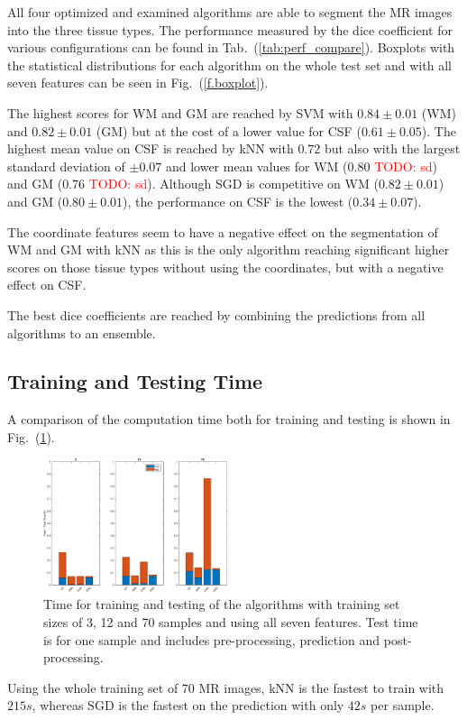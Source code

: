 \documentclass[journal]{IEEEtran}
\newcommand\TODO[1]{\textcolor{red}{TODO: #1}}
\begin{document}
All four optimized and examined algorithms are able to segment the MR images into the three tissue types. The performance measured by the dice coefficient for various configurations can be found in Tab.~(\ref{tab:perf_compare}). Boxplots with the statistical distributions for each algorithm on the whole test set and with all seven features can be seen in Fig.~(\ref{f.boxplot}).

The highest scores for WM and GM are reached by SVM with $0.84 \pm 0.01$ (WM) and $0.82 \pm 0.01$ (GM) but at the cost of a lower value for CSF ($0.61 \pm 0.05$). The highest mean value on CSF is reached by kNN with $0.72$ but also with the largest standard deviation of $\pm 0.07$ and lower mean values for WM ($0.80$ \TODO{sd}) and GM ($0.76$ \TODO{sd}). Although SGD is competitive on WM ($0.82 \pm 0.01$) and GM ($0.80 \pm 0.01$), the performance on CSF is the lowest ($0.34 \pm 0.07$).

The coordinate features seem to have a negative effect on the segmentation of WM and GM with kNN as this is the only algorithm reaching significant higher scores on those tissue types without using the coordinates, but with a negative effect on CSF.

The best dice coefficients are reached by combining the predictions from all algorithms to an ensemble.

\subsection{Training and Testing Time}
A comparison of the computation time both for training and testing is shown in Fig.~(\ref{f.runtimebarplot}).
\begin{figure}
	\centering
	\includegraphics[width=0.48\textwidth]{images/runtimes}
	\caption{Time for training and testing of the algorithms with training set sizes of 3, 12 and 70 samples and using all seven features. Test time is for one sample and includes pre-processing, prediction and post-processing.}\label{f.runtimebarplot}
\end{figure}
Using the whole training set of 70 MR images, kNN is the fastest to train with $215s$, whereas SGD is the fastest on the prediction with only $42s$ per sample.
\end{document}
